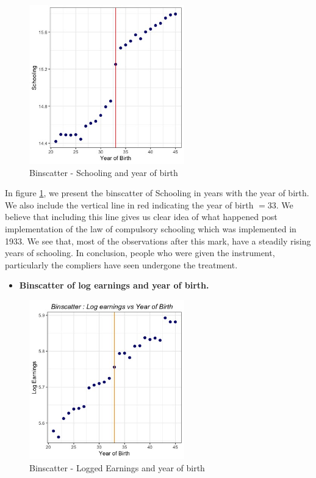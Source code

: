 \documentclass[a4paper,12pt,oneside,English]{article}
\begin{document}
     {\begin{figure}[h!]
    \centering
    \includegraphics[width=0.6\textwidth]{Binscatter 1.jpeg}
    \caption{Binscatter - Schooling and year of birth}
    \label{fig 2}
    \end{figure}}
In figure \ref{fig 2}, we present the binscatter of Schooling in years with the year of birth. We also include the vertical line in red indicating the year of birth $=33$. We believe that including this line gives us clear idea of what happened post implementation of the law of compulsory schooling which was implemented in 1933. We see that, most of the observations after this mark, have a steadily rising years of schooling. In conclusion, people who were given the instrument, particularly the compliers have seen undergone the treatment.
\\
\begin{itemize}
    \item \textbf{Binscatter of log earnings and year of birth.}
\end{itemize}
      {\begin{figure}[h!]
    \centering
    \includegraphics[width=0.6\textwidth]{Binscatter 3.jpeg}
    \caption{Binscatter - Logged Earnings and year of birth}
    \label{fig 3}
    \end{figure}}
\end{document}
